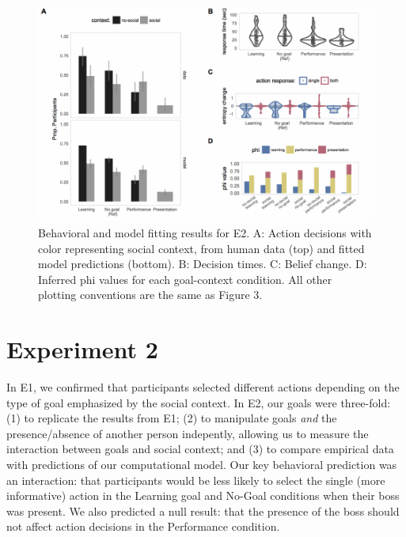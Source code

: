 \documentclass[10pt, letterpaper]{article}
\newenvironment{CodeChunk}{}{}
\begin{document}
\begin{CodeChunk}
\begin{figure}[tb]

{\centering \includegraphics[width=0.95\linewidth]{figs/e2_results-1} 

}

\caption[Behavioral and model fitting results for E2]{Behavioral and model fitting results for E2. A: Action decisions with color representing social context, from human data (top) and fitted model predictions (bottom). B: Decision times. C: Belief change. D: Inferred phi values for each goal-context condition. All other plotting conventions are the same as Figure 3.}\label{fig:e2_results}
\end{figure}
\end{CodeChunk}

\section{Experiment 2}\label{experiment-2}

In E1, we confirmed that participants selected different actions
depending on the type of goal emphasized by the social context. In E2,
our goals were three-fold: (1) to replicate the results from E1; (2) to
manipulate goals \emph{and} the presence/absence of another person
indepently, allowing us to measure the interaction between goals and
social context; and (3) to compare empirical data with predictions of
our computational model. Our key behavioral prediction was an
interaction: that participants would be less likely to select the single
(more informative) action in the Learning goal and No-Goal conditions
when their boss was present. We also predicted a null result: that the
presence of the boss should not affect action decisions in the
Performance condition.
\end{document}
